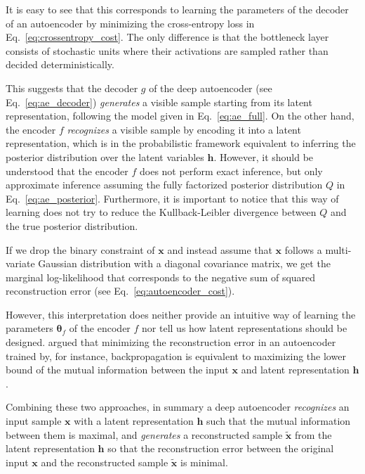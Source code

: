 \documentclass[dissertation,nocontribution,draft*]{aaltoseries}
\newcommand{\vect}[1]{\mathbf{#1}}
\newcommand{\vects}[1]{\boldsymbol{#1}}
\newcommand{\vh}[0]{\vect{h}}
\newcommand{\vx}[0]{\vect{x}}
\newcommand{\TT}[0]{{\vects{\theta}}}
\begin{document}
It is easy to see that this corresponds to learning the
parameters of the decoder of an autoencoder by minimizing
the cross-entropy loss in Eq.~\eqref{eq:crossentropy_cost}.
The only difference is that the bottleneck layer consists of
stochastic units where their activations are sampled
rather than decided deterministically. 

This suggests that the decoder $g$ of the deep autoencoder
(see Eq.~\eqref{eq:ae_decoder}) \textit{generates} a visible
sample starting from its latent representation, following
the model given in Eq.~\eqref{eq:ae_full}. On the other
hand, the encoder $f$ \textit{recognizes} a visible sample
by encoding it into a latent representation, which is in the
probabilistic framework equivalent to inferring the
posterior distribution over the latent variables $\vh$.
However, it should be understood that the encoder $f$ does
not perform exact inference, but only approximate inference
assuming the fully factorized posterior distribution $Q$ in
Eq.~\eqref{eq:ae_posterior}. Furthermore, it is important to
notice that this way of learning does not try to reduce the
Kullback-Leibler divergence between $Q$ and the true
posterior distribution.

If we drop the binary constraint of $\vx$ and instead assume
that $\vx$ follows a multi-variate Gaussian distribution
with a diagonal covariance matrix, we get the marginal
log-likelihood that corresponds to the negative sum of
squared reconstruction error (see
Eq.~\eqref{eq:autoencoder_cost}).

However, this interpretation does neither provide an
intuitive way of learning the parameters $\TT_f$ of the
encoder $f$ nor tell us how latent representations should be
designed.  \citet{Vincent2010} argued that minimizing the
reconstruction error in an autoencoder trained by, for
instance, backpropagation is equivalent to maximizing the
lower bound of the mutual information between the input
$\vx$ and latent representation $\vh$. 

Combining these two approaches, in summary a deep
autoencoder \textit{recognizes} an input sample $\vx$ with a
latent representation $\vh$ such that the mutual information
between them is maximal, and \textit{generates} a
reconstructed sample $\tilde{\vx}$ from the latent
representation $\vh$ so that the reconstruction error
between the original input $\vx$ and the reconstructed
sample $\tilde{\vx}$ is minimal.
\end{document}
